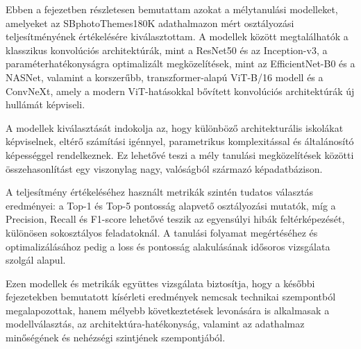 Ebben a fejezetben részletesen bemutattam azokat a mélytanulási modelleket, amelyeket az SBphotoThemes180K adathalmazon mért osztályozási teljesítményének értékelésére kiválasztottam. A modellek között megtalálhatók a klasszikus konvolúciós architektúrák, mint a ResNet50 és az Inception-v3, a paraméterhatékonyságra optimalizált megközelítések, mint az EfficientNet-B0 és a NASNet, valamint a korszerűbb, transzformer-alapú ViT-B/16 modell és a ConvNeXt, amely a modern ViT-hatásokkal bővített konvolúciós architektúrák új hullámát képviseli.

A modellek kiválasztását indokolja az, hogy különböző architekturális iskolákat képviselnek, eltérő számítási igénnyel, parametrikus komplexitással és általánosító képességgel rendelkeznek. Ez lehetővé teszi a mély tanulási megközelítések közötti összehasonlítást egy viszonylag nagy, valóságból származó képadatbázison.

A teljesítmény értékeléséhez használt metrikák szintén tudatos választás eredményei: a Top-1 és Top-5 pontosság alapvető osztályozási mutatók, míg a Precision, Recall és F1-score lehetővé teszik az egyensúlyi hibák feltérképezését, különösen sokosztályos feladatoknál. A tanulási folyamat megértéséhez és optimalizálásához pedig a loss és pontosság alakulásának idősoros vizsgálata szolgál alapul.

Ezen modellek és metrikák együttes vizsgálata biztosítja, hogy a későbbi fejezetekben bemutatott kísérleti eredmények nemcsak technikai szempontból megalapozottak, hanem mélyebb következtetések levonására is alkalmasak a modellválasztás, az architektúra-hatékonyság, valamint az adathalmaz minőségének és nehézségi szintjének szempontjából.